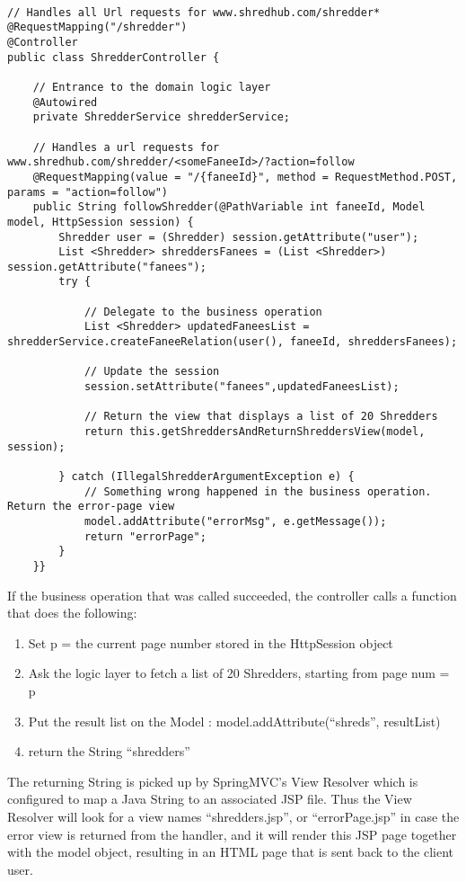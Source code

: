 \begin{lstlisting}

// Handles all Url requests for www.shredhub.com/shredder*
@RequestMapping("/shredder")
@Controller
public class ShredderController {
		
	// Entrance to the domain logic layer
	@Autowired
	private ShredderService shredderService;
			
	// Handles a url requests for www.shredhub.com/shredder/<someFaneeId>/?action=follow
	@RequestMapping(value = "/{faneeId}", method = RequestMethod.POST, params = "action=follow")
	public String followShredder(@PathVariable int faneeId, Model model, HttpSession session) {
		Shredder user = (Shredder) session.getAttribute("user");
		List <Shredder> shreddersFanees = (List <Shredder>) session.getAttribute("fanees");
		try {
			
			// Delegate to the business operation
			List <Shredder> updatedFaneesList = shredderService.createFaneeRelation(user(), faneeId, shreddersFanees);
			
			// Update the session 
			session.setAttribute("fanees",updatedFaneesList);
			
			// Return the view that displays a list of 20 Shredders
			return this.getShreddersAndReturnShreddersView(model, session);
			
		} catch (IllegalShredderArgumentException e) {
			// Something wrong happened in the business operation. Return the error-page view
			model.addAttribute("errorMsg", e.getMessage());
			return "errorPage";
		}
	}}	  
\end{lstlisting}
If the business operation that was called succeeded, the controller calls a function that does the following:
\begin{enumerate}
\item{} Set p = the current page number stored in the HttpSession object
\item{} Ask the logic layer to fetch a list of 20 Shredders, starting from page num = p
\item{} Put the result list on the Model : model.addAttribute(``shreds'', resultList)
\item{} return the String ``shredders''
\end{enumerate}
The returning String is picked up by SpringMVC's View Resolver which is configured to map a Java String to an associated JSP file. Thus the View Resolver will look for a view names ``shredders.jsp'', or ``errorPage.jsp'' in case the error view is returned from the handler, and it will render this JSP page together with the model object, resulting in an HTML page that is sent back to the client user. 


